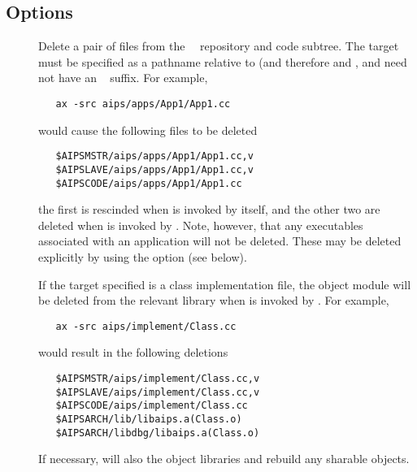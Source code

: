 \subsection*{Options}

\begin{description}
\item[]
   Delete a pair of files from the \aipspp\ \rcs\ repository and code subtree.
   The target must be specified as a pathname relative to 
   (and therefore  and , and need not have
   an \rcs\  suffix.  For example,

\begin{verbatim}
   ax -src aips/apps/App1/App1.cc
\end{verbatim}

   \noindent
   would cause the following files to be deleted

\begin{verbatim}
   $AIPSMSTR/aips/apps/App1/App1.cc,v
   $AIPSLAVE/aips/apps/App1/App1.cc,v
   $AIPSCODE/aips/apps/App1/App1.cc
\end{verbatim}

   \noindent
   the first is rescinded when  is invoked by  itself,
   and the other two are deleted when  is invoked by
   .  Note, however, that any executables associated with an
   application will not be deleted.  These may be deleted explicitly by using
   the  option (see below).

   \noindent
   If the target specified is a class implementation file, the object module
   will be deleted from the relevant library when  is invoked
   by .  For example,

\begin{verbatim}
   ax -src aips/implement/Class.cc
\end{verbatim}

   \noindent
   would result in the following deletions

\begin{verbatim}
   $AIPSMSTR/aips/implement/Class.cc,v
   $AIPSLAVE/aips/implement/Class.cc,v
   $AIPSCODE/aips/implement/Class.cc
   $AIPSARCH/lib/libaips.a(Class.o)
   $AIPSARCH/libdbg/libaips.a(Class.o)
\end{verbatim}

   \noindent
   If necessary,  will also  the object
   libraries and rebuild any sharable objects.


\end{description}
